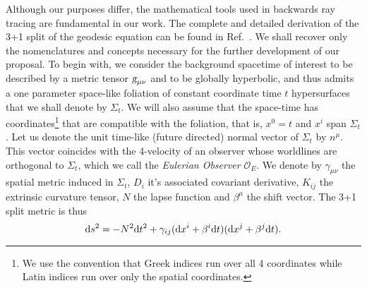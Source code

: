 Although our purposes differ, the mathematical tools used in backwards ray tracing are fundamental in our work. The complete and detailed derivation of the 3+1 split of the geodesic equation can be found in Ref.~\cite{Vincent_2012}. We shall recover only the nomenclatures and concepts necessary for the further development of our proposal. To begin with, we consider the background spacetime of interest to be described by a metric tensor $\mtrtens{\mu}{\nu}$ and to be globally hyperbolic, and thus admits a one parameter space-like foliation of constant coordinate time $t$ hypersurfaces that we shall denote by $\Sigma_t$. We will also assume that the space-time has coordinates\footnote{We use the convention that Greek indices run over all 4 coordinates while Latin indices run over only the spatial coordinates.} that are compatible with the foliation, that is, $x^0=t$ and $x^i$ span $\Sigma_t$. Let us denote the unit time-like (future directed) normal vector of $\Sigma_t$ by $n^\mu$. This vector coincides with the 4-velocity of an observer whose worldlines are orthogonal to $\Sigma_t$, which we call the \emph{Eulerian Observer} $\mathcal{O}_E$. We denote by $\gamma_{\mu\nu}$ the spatial metric induced in $\Sigma_t$, $D_i$ it's associated covariant derivative, $K_{ij}$ the extrinsic curvature tensor, $N$ the lapse function and $\beta^\mu$ the shift vector. The 3+1 split metric is thus
%
\begin{equation}
  \mathrm{d} s^2 = -N^2 \mathrm{d} t^2 + \gamma_{ij}(\mathrm{d} x^i + \beta^i \mathrm{d} t)(\mathrm{d} x^j + \beta^j \mathrm{d} t).
  \label{eq:arbitrary_penrose_decomposed_metric}
\end{equation}

